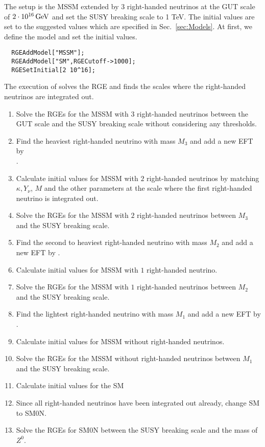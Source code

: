 \documentclass[10pt,a4paper,twoside]{scrartcl}
\begin{document}
The setup is the MSSM extended by 3 right-handed neutrinos at the GUT scale of
$2\cdot10^{16} \,\mathrm{GeV}$ and set the SUSY breaking scale to 1 TeV. The initial values
are set to the suggested values which are specified in Sec.~\ref{sec:Models}.
At first, we define the model and set the initial values.
\begin{verbatim}
  RGEAddModel["MSSM"];
  RGEAddModel["SM",RGECutoff->1000];
  RGESetInitial[2 10^16];
\end{verbatim}
The execution of  solves the RGE and finds the scales where
the right-handed neutrinos are integrated out.

\begin{enumerate}
\item Solve the RGEs for the MSSM with $3$ right-handed neutrinos between the
  GUT scale and the SUSY breaking scale without considering any thresholds.
\item Find the heaviest right-handed neutrino with mass $M_3$ and add a new EFT
  by \\ .
\item Calculate initial values for MSSM with $2$ right-handed neutrinos by matching $\kappa,
  Y_\nu$, $M$ and the other parameters at the scale where the first right-handed neutrino is integrated out.
\item Solve the RGEs for the MSSM with $2$ right-handed neutrinos between $M_3$ and
  the SUSY breaking scale.
\item Find the second to heaviest right-handed neutrino with mass $M_2$ and add
  a new EFT by .
\item Calculate initial values for MSSM with $1$ right-handed neutrino.
\item Solve the RGEs for the MSSM with $1$ right-handed neutrinos between $M_2$ and
  the SUSY breaking scale.
\item Find the lightest right-handed neutrino with mass $M_1$ and add
  a new EFT by\\ .
\item Calculate initial values for MSSM without right-handed neutrinos.
\item Solve the RGEs for the MSSM without right-handed neutrinos between $M_1$
  and the SUSY breaking scale.
\item Calculate initial values for the SM
\item Since all right-handed neutrinos have been integrated out already, change
  SM to SM0N.
\item Solve the RGEs for SM0N between the SUSY breaking scale and the mass of $Z^0$.
\end{enumerate}
\end{document}
